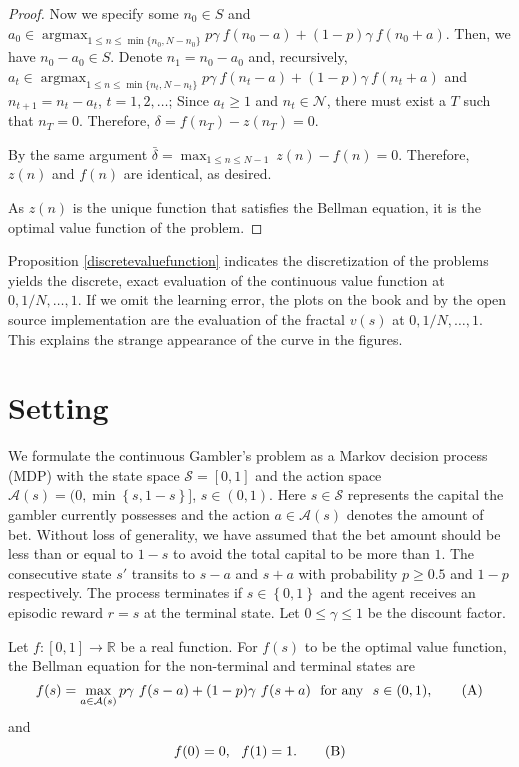 \documentclass{article}
\theoremstyle{named}
\DeclareMathOperator*{\argmax}{arg max}
\newcommand{\RR}{\mathbb{R}}
\newcommand{\cN}{\mathcal{N}}
\newcommand{\cS}{\mathcal{S}}
\newcommand{\cA}{\mathcal{A}}
\newcommand{\set}[1]{\left\{#1\right\}}
\begin{document}
\begin{proof}
Now we specify some $n_0\in S$ and $a_0\in\argmax_{1\leq n \leq \min\{n_0, N-n_0\}}p\gamma\ f(n_0-a)+(1-p)\gamma\ f(n_0+a)$. Then, we have $n_0-a_0\in S$. Denote $n_1=n_0-a_0$ and, recursively, $a_t\in\argmax_{1\leq n \leq \min\{n_t, N-n_t\}}p\gamma\ f(n_t-a)+(1-p)\gamma\ f(n_t+a)$ and $n_{t+1}=n_t-a_t$, $t=1,2,\dots$; Since $a_t\geq 1$ and $n_t\in\cN$, there must exist a $T$ such that $n_T=0$. Therefore, $\delta=f(n_T)-z(n_T)=0$.

By the same argument $\bar\delta=\max_{1\leq n\leq N-1}\ z(n)-f(n)=0$. Therefore, $z(n)$ and $f(n)$ are identical, as desired.

As $z(n)$ is the unique function that satisfies the Bellman equation, it is the optimal value function of the problem. 
\end{proof}

Proposition \ref{discretevaluefunction} indicates the discretization of the problems yields the discrete, exact evaluation of the continuous value function at $0, 1/N, \dots, 1$. If we omit the learning error, the plots on the book and by the open source implementation \citep{zhang2019python} are the evaluation of the fractal $v(s)$ at $0, 1/N, \dots, 1$. This explains the strange appearance of the curve in the figures. 


\section{Setting}

We formulate the continuous Gambler's problem as a Markov decision process (MDP) with the state space $\cS=[0,1]$ and the action space $\cA(s)=(0,\min\set{s,1-s}]$, $s\in (0,1)$.
Here $s\in \cS$ represents the capital the gambler currently possesses and the action $a\in\cA(s)$ denotes the amount of bet. 
Without loss of generality, we have assumed that the bet amount should be less than or equal to $1-s$ to avoid the total capital to be more than $1$.
The consecutive state $s'$ transits to $s-a$ and $s+a$ with probability $p\geq 0.5$ and $1-p$ respectively. The process terminates if $s\in\set{0,1}$ and the agent receives an episodic reward $r=s$ at the terminal state. Let $0\leq \gamma\leq 1$ be the discount factor.

Let $f:[0,1]\to\RR$ be a real function. For $f(s)$ to be the optimal value function, the Bellman equation for the non-terminal and terminal states are 
\[
f(s) = \max_{a\in \cA(s)} p\gamma\ f(s-a) + (1-p)\gamma\ f(s+a)\ \  \text{for any}\ \ s\in (0,1), \tag{{A}}
\]
and
\[
f(0)=0,\ \ f(1)=1. \tag{{B}}
\]
\end{document}
